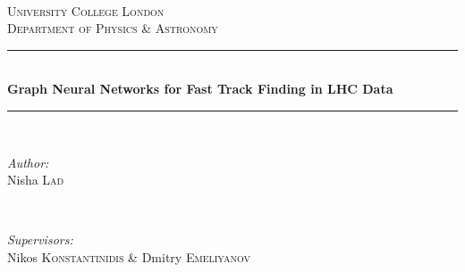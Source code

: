 \documentclass[12pt, a4paper]{book}
\begin{document}
\begin{titlepage}


\newcommand{\HRule}{\rule{\linewidth}{0.5mm}} %
\center %



\textsc{}\\[2.0cm]
\textsc{\LARGE University College London}\\[0.5cm] %
\textsc{\Large Department of Physics \& Astronomy}\\[1.0cm] %



\HRule \\[0.65cm]
{ \huge \bfseries Graph Neural Networks for Fast Track Finding in LHC Data}\\[0.4cm] %
\HRule \\[1.5cm]
 
 
\begin{minipage}{0.4\textwidth}
\begin{flushleft} \large
\emph{Author:}\\
Nisha \textsc{Lad} %
\end{flushleft}
\end{minipage}
~
\begin{minipage}{0.4\textwidth}
\begin{flushright} \large
\emph{Supervisors:} \\
Nikos \textsc{Konstantinidis} \& Dmitry \textsc{Emeliyanov} %
\end{flushright}
\end{minipage}\\[2cm]




\end{titlepage}
\end{document}
